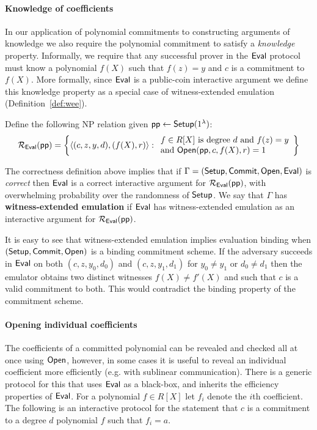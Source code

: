 \documentclass{article}
\theoremstyle{definition}
\begin{document}
\paragraph{Knowledge of coefficients} In our application of polynomial commitments to constructing arguments of knowledge we also require the polynomial commitment to satisfy a \emph{knowledge} property. Informally, we require that any successful prover in the $\textsf{{Eval}}$ protocol must know a polynomial $f(X)$ such that $f(z) = y$ and $c$ is a commitment to $f(X)$. More formally, since $\textsf{{Eval}}$ is a public-coin interactive argument we define this knowledge property as a special case of witness-extended emulation (Definition~\ref{def:wee}). 

Define the following NP relation given $\textsf{pp} \leftarrow \textsf{{Setup}}(1^\lambda)$: 
\[ 
\mathcal{R_\textsf{Eval}}(\textsf{pp}) = \left\{
\langle (c, z, y, d), (f(X), r) \rangle
: 
\begin{array}{l} 
f \in R[X] \ \text{is degree} \ d \ \text{and} \ f(z) = y \\ 
 \text{and} \ \textsf{{Open}}(\textsf{pp}, c, f(X), r) = 1 \\
\end{array}
\right\}
\] 

The correctness definition above implies that if $\Gamma = (\textsf{{Setup}}, \textsf{{Commit}}, \textsf{{Open}}, \textsf{{Eval}})$ is \emph{correct} then $\textsf{{Eval}}$ is a correct interactive argument for $\mathcal{R_\textsf{Eval}}(\textsf{pp})$, with overwhelming probability over the randomness of $\textsf{{Setup}}$. We say that $\Gamma$ has \textbf{witness-extended emulation} if $\textsf{{Eval}}$ has witness-extended emulation as an interactive argument for $\mathcal{R_\textsf{Eval}}(\textsf{pp})$. 

It is easy to see that witness-extended emulation implies evaluation binding when $(\textsf{{Setup}}, \textsf{{Commit}}, \textsf{{Open}})$ is a binding commitment scheme. If the adversary succeeds in $\textsf{{Eval}}$ on both $(c, z, y_0, d_0)$ and $(c, z, y_1, d_1)$ for $y_0 \neq y_1$ or $d_0 \neq d_1$ then the emulator obtains two distinct witnesses $f(X) \neq f'(X)$ and such that $c$ is a valid commitment to both. This would contradict the binding property of the commitment scheme. 

\paragraph{Opening individual coefficients} The coefficients of a committed polynomial can be revealed and checked all at once using $\textsf{{Open}}$, however, in some cases it is useful to reveal an individual coefficient more efficiently (e.g. with sublinear communication). 
There is a generic protocol for this that uses $\textsf{{Eval}}$ as a black-box, and inherits the efficiency properties of $\textsf{{Eval}}$. 
For a polynomial $f \in R[X]$ let $f_i$ denote the $i$th coefficient. The following is an interactive protocol for the statement that $c$ is a commitment to a degree $d$ polynomial $f$ such that $f_i = a$. \\
\end{document}
